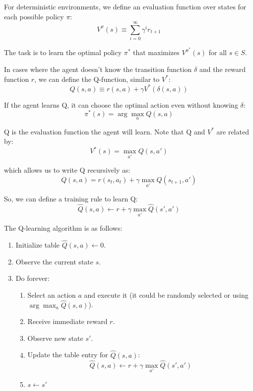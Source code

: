 \documentclass[12pt]{article}
\begin{document}
\begin{enumerate}[label=\textbf{RL.\arabic*}]
          For deterministic environments, we define an evaluation function over states for each possible policy $\pi$:
          \[
              V^\pi(s) \equiv \sum_{i=0}^{\infty} \gamma^i r_{t+1}
          \]

          The task is to learn the optimal policy $\pi^*$ that maximizes $V^{\pi^*}(s)$ for all $s \in S$.

          In cases where the agent doesn't know the transition function $\delta$ and the reward function $r$, we can define the Q-function, similar to $V^*$:
          \[
              Q(s,a) \equiv r(s,a) + \gamma V^*(\delta(s,a))
          \]

          If the agent learns Q, it can choose the optimal action even without knowing $\delta$:
          \[
              \pi^*(s) = \arg\max_{a} Q(s,a)
          \]

          Q is the evaluation function the agent will learn. Note that Q and $V^*$ are related by:
          \[
              V^*(s) = \max_{a'} Q(s,a')
          \]

          which allows us to write Q recursively as:
          \[
              Q(s,a) = r(s_t,a_t) + \gamma\max_{a'}Q(s_{t+1},a')
          \]

          So, we can define a training rule to learn Q:
          \[
              \hat{Q}(s,a) \leftarrow r + \gamma\max_{a'}\hat{Q}(s',a')
          \]

          The Q-learning algorithm is as follows:
          \begin{enumerate}
              \item Initialize table $\hat{Q}(s,a) \leftarrow 0$.
              \item Observe the current state $s$.
              \item Do forever:
                    \begin{enumerate}
                        \item Select an action $a$ and execute it (it could be randomly selected or using $\arg\max_a \hat{Q}(s,a)$).
                        \item Receive immediate reward $r$.
                        \item Observe new state $s'$.
                        \item Update the table entry for $\hat{Q}(s,a)$:
                              \[
                                  \hat{Q}(s,a) \leftarrow r + \gamma\max_{a'}\hat{Q}(s',a')
                              \]
                        \item $s \leftarrow s'$
                    \end{enumerate}
          \end{enumerate}


\end{enumerate}
\end{document}
